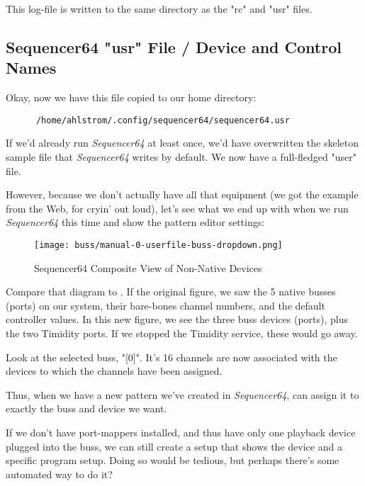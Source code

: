    This log-file is written to the same directory as the "rc" and "usr" files.

\subsection{Sequencer64 "usr" File / Device and Control Names}
\label{subsec:seq64_usr_file_midi_bus_results}

   Okay, now we have this file copied to our home directory:

   \begin{verbatim}
      /home/ahlstrom/.config/sequencer64/sequencer64.usr
   \end{verbatim}

   If we'd already run \textsl{Sequencer64} at least once, we'd have
   overwritten the skeleton sample file that \textsl{Sequencer64}
   writes by default.  We now have a full-fledged "user" file.

   However, because we don't actually have all that equipment (we got the
   example from the Web, for cryin' out loud), let's see what we end up with
   when we run \textsl{Sequencer64} this time and show the pattern editor
   settings:

\begin{figure}[H]
   \centering 
   \texttt{[image: buss/manual-0-userfile-buss-dropdown.png]}
   \caption{Sequencer64 Composite View of Non-Native Devices}
   \label{fig:seq64_manual_0_userfile_buss_dropdown}
\end{figure}

   Compare that diagram to .
   If the original figure, we saw the 5 native busses (ports) on our system,
   their bare-bones channel numbers, and the default controller values.  In
   this new figure, we see the three buss devices (ports), plus the two
   Timidity ports.  If we stopped the Timidity service, these would go away.

   Look at the selected buss, "[0]".  It's 16 channels are now associated with
   the devices to which the channels have been assigned.

   Thus, when we have a new pattern we've created in \textsl{Sequencer64},
   can assign it to exactly the buss and device we want.

   If we don't have port-mappers installed, and thus have only one playback
   device plugged into the buss, we can still create a setup that
   shows the device and a specific program setup.  Doing so would be tedious,
   but perhaps there's some automated way to do it?

